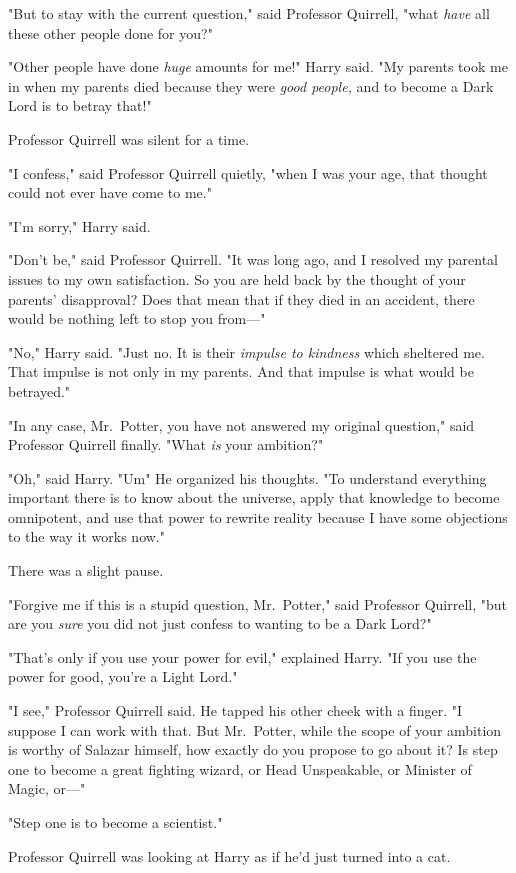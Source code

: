 "But to stay with the current question," said Professor Quirrell, "what
\emph{have} all these other people done for you?"

"Other people have done \emph{huge} amounts for me!" Harry said. "My parents
took me in when my parents died because they were \emph{good people,} and to
become a Dark Lord is to betray that!"

Professor Quirrell was silent for a time.

"I confess," said Professor Quirrell quietly, "when I was your age, that
thought could not ever have come to me."

"I'm sorry," Harry said.

"Don't be," said Professor Quirrell. "It was long ago, and I resolved my
parental issues to my own satisfaction. So you are held back by the thought of
your parents' disapproval? Does that mean that if they died in an accident,
there would be nothing left to stop you from—"

"No," Harry said. "Just no. It is their \emph{impulse to kindness} which
sheltered me. That impulse is not only in my parents. And that impulse is what
would be betrayed."

"In any case, Mr.~Potter, you have not answered my original question," said
Professor Quirrell finally. "What \emph{is} your ambition?"

"Oh," said Harry. "Um{\el}" He organized his thoughts. "To understand everything
important there is to know about the universe, apply that knowledge to become
omnipotent, and use that power to rewrite reality because I have some
objections to the way it works now."

There was a slight pause.

"Forgive me if this is a stupid question, Mr.~Potter," said Professor Quirrell,
"but are you \emph{sure} you did not just confess to wanting to be a Dark Lord?"

"That's only if you use your power for evil," explained Harry. "If you use the
power for good, you're a Light Lord."

"I see," Professor Quirrell said. He tapped his other cheek with a finger. "I
suppose I can work with that. But Mr.~Potter, while the scope of your ambition
is worthy of Salazar himself, how exactly do you propose to go about it? Is
step one to become a great fighting wizard, or Head Unspeakable, or Minister of
Magic, or—"

"Step one is to become a scientist."

Professor Quirrell was looking at Harry as if he'd just turned into a cat.

